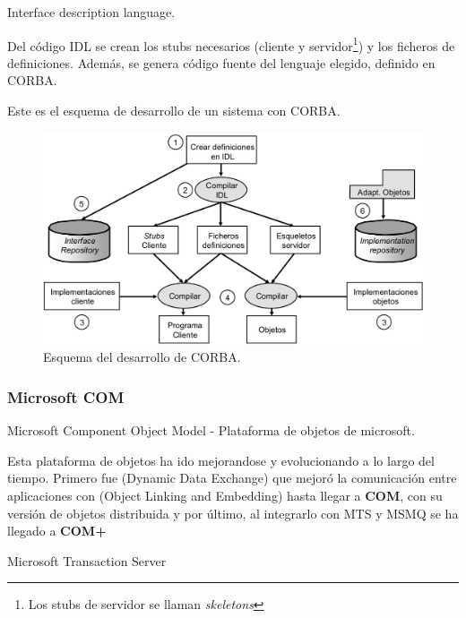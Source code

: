\begin{defn}[IDL]
Interface description language.
\end{defn}

Del código IDL se crean los stubs necesarios (cliente y servidor\footnote{Los stubs de servidor se llaman \textit{skeletons}}) y los ficheros de definiciones. Además, se genera código fuente del lenguaje elegido, definido en CORBA.

Este es el esquema de desarrollo de un sistema con CORBA.


\begin{figure}[hbtp]
\centering
\includegraphics[width=1\textwidth]{img/CORBA.png}
\caption{Esquema del desarrollo de CORBA.}
\label{OMA}
\end{figure}


\subsubsection{Microsoft COM}

\begin{defn}
	Microsoft Component Object Model - Plataforma de objetos de microsoft.
\end{defn}

Esta plataforma de objetos ha ido mejorandose y evolucionando a lo largo del tiempo. Primero fue  (Dynamic Data Exchange) que mejoró la comunicación entre aplicaciones con  (Object Linking and Embedding) hasta llegar a \textbf{COM}, con su versión de objetos distribuida  y por último, al integrarlo con MTS y MSMQ se ha llegado a \textbf{COM+}

\begin{defn}[MTS]
	Microsoft Transaction Server
\end{defn}

